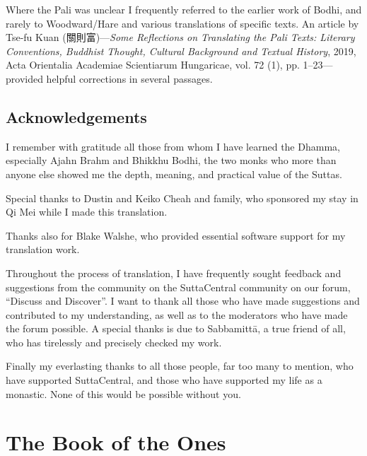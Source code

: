 \documentclass[12pt,openany]{book}%
\let\oldcontentsline\contentsline
\newcommand{\nopagecontentsline}[3]{\oldcontentsline{#1}{#2}{}}
\let\oldmainmatter\mainmatter
\renewcommand{\mainmatter}{%
\chapterfont{\setstretch{.85}\normalfont\centering}%
\sectionfont{\setstretch{.85}\normalfont\centering}%
\oldmainmatter}
\begin{document}
Where the Pali was unclear I frequently referred to the earlier work of Bodhi, and rarely to Woodward/Hare and various translations of specific texts. An article by Tse-fu Kuan (關則富)—\textit{Some Reflections on Translating the Pali Texts: Literary Conventions, Buddhist Thought, Cultural Background and Textual History}, 2019, Acta Orientalia Academiae Scientiarum Hungaricae, vol. 72 (1), pp. 1–23—provided helpful corrections in several passages.

%
\chapter*{Acknowledgements}

I remember with gratitude all those from whom I have learned the Dhamma, especially Ajahn Brahm and Bhikkhu Bodhi, the two monks who more than anyone else showed me the depth, meaning, and practical value of the Suttas.

Special thanks to Dustin and Keiko Cheah and family, who sponsored my stay in Qi Mei while I made this translation.

Thanks also for Blake Walshe, who provided essential software support for my translation work.

Throughout the process of translation, I have frequently sought feedback and suggestions from the community on the SuttaCentral community on our forum, “Discuss and Discover”. I want to thank all those who have made suggestions and contributed to my understanding, as well as to the moderators who have made the forum possible. A special thanks is due to \textsanskrit{Sabbamittā}, a true friend of all, who has tirelessly and precisely checked my work.

Finally my everlasting thanks to all those people, far too many to mention, who have supported SuttaCentral, and those who have supported my life as a monastic. None of this would be possible without you.

%
\mainmatter%
\pagestyle{fancy}%
\part*{The Book of the Ones }
\markboth{}{}
\addtocontents{toc}{\let\protect\contentsline\protect\oldcontentsline}

%
%
\end{document}
